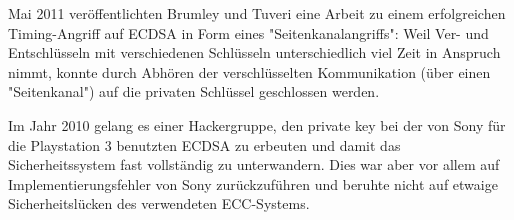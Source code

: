 \begin{bem}
	Mai 2011 veröffentlichten Brumley und Tuveri eine Arbeit zu einem erfolgreichen Timing-Angriff auf ECDSA in Form eines "Seitenkanalangriffs":
	Weil Ver- und Entschlüsseln mit verschiedenen Schlüsseln unterschiedlich viel Zeit in Anspruch nimmt, konnte durch Abhören der verschlüsselten Kommunikation (über einen "Seitenkanal") auf die privaten Schlüssel geschlossen werden.
\end{bem}

\begin{bem}
	Im Jahr 2010 gelang es einer Hackergruppe, den private key bei der von Sony für die Playstation 3 benutzten ECDSA zu erbeuten und damit das Sicherheitssystem fast vollständig zu unterwandern.
	Dies war aber vor allem auf Implementierungsfehler von Sony zurückzuführen und beruhte nicht auf etwaige Sicherheitslücken des verwendeten ECC-Systems.
\end{bem}
\cleardoubleoddemptypage